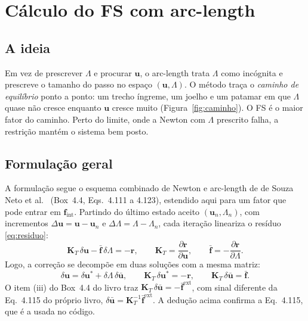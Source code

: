 \documentclass[11pt,a4paper]{article}
\numberwithin{equation}{section}
\begin{document}
\section{Cálculo do FS com arc-length}\label{sec:arco}

\subsection{A ideia}

Em vez de prescrever $\Lambda$ e procurar $\mathbf{u}$, o arc-length trata $\Lambda$ como incógnita e prescreve o tamanho do passo no espaço $(\mathbf{u},\Lambda)$. O método traça o
\emph{caminho de equilíbrio} ponto a ponto: um trecho íngreme, um joelho e um patamar em que $\Lambda$ quase não cresce enquanto $\mathbf{u}$ cresce muito
(Figura~\ref{fig:caminho}). O FS é o maior fator do caminho. Perto do limite, onde a Newton com $\Lambda$ prescrito falha, a restrição mantém o sistema bem posto.

\subsection{Formulação geral}

A formulação segue o esquema combinado de Newton e arc-length de de Souza Neto et al.~\cite{souzaneto2008} (Box~4.4, Eqs.~4.111 a 4.123), estendido aqui para um fator que pode
entrar em $\mathbf{f}_{\mathrm{int}}$. Partindo do último estado aceito $(\mathbf{u}_n,\Lambda_n)$, com incrementos $\Delta\mathbf{u} = \mathbf{u}-\mathbf{u}_n$ e $\Delta\Lambda = \Lambda-\Lambda_n$, cada iteração lineariza o
resíduo \eqref{eq:residuo}:
\begin{equation}
\mathbf{K}_T\,\delta\mathbf{u} - \bar{\mathbf{f}}\,\delta\Lambda = -\mathbf{r},
\qquad \mathbf{K}_T = \frac{\partial\mathbf{r}}{\partial\mathbf{u}},
\qquad \bar{\mathbf{f}} = -\frac{\partial\mathbf{r}}{\partial\Lambda}.
\end{equation}
Logo, a correção se decompõe em duas soluções com a mesma matriz:
\begin{equation}\label{eq:decomp}
\delta\mathbf{u} = \delta\mathbf{u}^{*} + \delta\Lambda\,\delta\bar{\mathbf{u}},
\qquad \mathbf{K}_T\,\delta\mathbf{u}^{*} = -\mathbf{r},
\qquad \mathbf{K}_T\,\delta\bar{\mathbf{u}} = \bar{\mathbf{f}}.
\end{equation}
O item (iii) do Box~4.4 do livro traz $\mathbf{K}_T\,\delta\bar{\mathbf{u}} = -\bar{\mathbf{f}}^{\mathrm{ext}}$, com sinal diferente da Eq.~4.115 do próprio livro,
$\delta\bar{\mathbf{u}} = \mathbf{K}_T^{-1}\bar{\mathbf{f}}^{\mathrm{ext}}$. A dedução acima confirma a Eq.~4.115, que é a usada no código.
\end{document}
